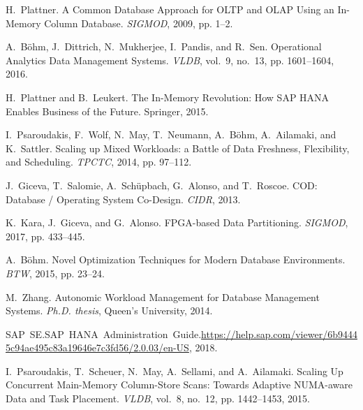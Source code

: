 \documentclass[11pt]{article}
\begin{document}
\begin{thebibliography}{10}
\itemsep=1pt
\begin{small}
H.~Plattner. \newblock A Common Database Approach for OLTP and OLAP Using an In-Memory Column Database. \newblock \emph{SIGMOD}, 2009, pp. 1--2.

A.~B{\"{o}}hm, J.~Dittrich, N.~Mukherjee, I.~Pandis, and R.~Sen. \newblock Operational Analytics Data Management Systems. \newblock \emph{VLDB}, vol.~9, no.~13, pp.
1601--1604, 2016.

H.~Plattner and B.~Leukert. \newblock The In-Memory Revolution: How SAP HANA Enables Business of the Future. \newblock Springer, 2015.

I.~Psaroudakis, F.~Wolf, N.~May, T.~Neumann, A.~B{\"{o}}hm, A.~Ailamaki, and
K.~Sattler. \newblock Scaling up Mixed Workloads: a Battle of Data Freshness, Flexibility, and Scheduling. \newblock \emph{TPCTC}, 2014, pp. 97--112.

J.~Giceva, T.~Salomie, A.~Sch{\"{u}}pbach, G.~Alonso, and T.~Roscoe. \newblock COD: Database / Operating System Co-Design. \newblock \emph{CIDR}, 2013.

K.~Kara, J.~Giceva, and G.~Alonso. \newblock FPGA-based Data Partitioning. \newblock \emph{SIGMOD}, 2017, pp. 433--445.

A.~B{\"{o}}hm. \newblock Novel Optimization Techniques for Modern Database Environments. \newblock \emph{BTW}, 2015, pp. 23--24.

M.~Zhang. \newblock Autonomic Workload Management for Database Management Systems. \newblock \emph{Ph.D. thesis}, Queen's University, 2014.

\mbox{SAP SE}.\hspace{1mm}\mbox{SAP HANA Administration Guide}.\hspace{1mm}\url{https://help.sap.com/viewer/6b94445c94ae495c83a19646e7c3fd56/2.0.03/en-US}, 2018.

I.~Psaroudakis, T.~Scheuer, N.~May, A.~Sellami, and A.~Ailamaki. \newblock Scaling Up Concurrent Main-Memory Column-Store Scans: Towards Adaptive NUMA-aware Data and Task Placement. \newblock \emph{VLDB}, vol.~8, no.~12, pp. 1442--1453,
2015.


\end{small}
\end{thebibliography}
\end{document}
